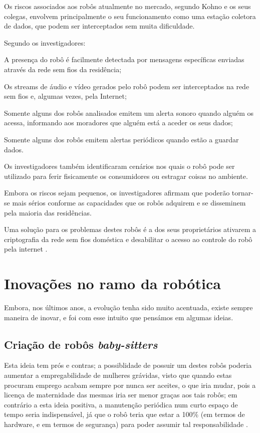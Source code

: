 \documentclass[10pt]{article}
\begin{document}
Os riscos associados aos robôs atualmente no mercado, segundo Kohno e os seus colegas, envolvem principalmente o seu funcionamento como uma estação coletora de dados, que podem ser interceptados sem muita dificuldade.

Segundo os investigadores:

A presença do robô é facilmente detectada por mensagens específicas enviadas através da rede sem fios da residência;

Os streams de áudio e vídeo gerados pelo robô podem ser interceptados na rede sem fios e, algumas vezes, pela Internet;

Somente alguns dos robôs analisados emitem um alerta sonoro quando alguém os acessa, informando aos moradores que alguém está a aceder os seus dados;

Somente alguns dos robôs emitem alertas periódicos quando estão a guardar dados.

Os investigadores também identificaram cenários nos quais o robô pode ser utilizado para ferir fisicamente os consumidores ou estragar coisas no ambiente.

Embora os riscos sejam pequenos, os investigadores afirmam que poderão tornar-se mais sérios conforme as capacidades que os robôs adquirem e se disseminem pela maioria das residências.

Uma solução para os problemas destes robôs é a dos seus proprietários ativarem a criptografia da rede sem fios doméstica e desabilitar o acesso ao controle do robô pela internet \cite{security}.


\section{Inovações no ramo da robótica}

\hspace{\parindent}Embora, nos últimos anos, a evolução tenha sido muito acentuada, existe sempre maneira de inovar, e foi com esse intuito que pensámos em algumas ideias.

\subsection{\textbf{Criação de robôs \textit{baby-sitters}}}
\hspace{\parindent}Esta ideia tem prós e contras; a possiblidade de possuir um destes robôs poderia aumentar a empregabilidade de mulheres grávidas, visto que quando estas procuram emprego acabam sempre por nunca ser aceites, o que iria mudar, pois a licença de maternidade das mesmas iria ser menor graças aos tais robôs; em contrário a esta ideia positiva, a manutenção periódica num curto espaço de tempo seria indispensável, já que o robô teria que estar a 100\% (em termos de hardware, e em termos de segurança) para poder assumir tal responsabilidade \cite{baby}.
\end{document}
